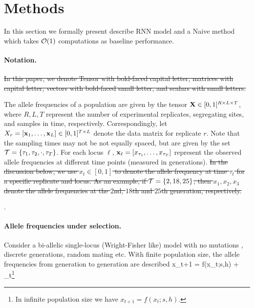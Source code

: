\section{Methods}
In this section we formally present describe RNN model and a Naive method which takes ${\cal O}(1)$ computations as baseline performance.

\paragraph{Notation.}
\sout{In this paper, we denote Tensor with bold-faced capital letter,
  matrices with capital letter, vectors with bold-faced small letter,
  and scalars with small letters.}

The allele frequencies of a population are given by the tensor ${\mathbf X}
\in [0,1]^{R \times L \times T}$, where $R,L,T$ represent the number
of experimental replicates, segregating sites, and samples in time,
respectively. Correspondingly, let $X_r=[{\mathbf x}_1 ,\ldots, {\mathbf x}_L]\in
[0,1]^ {T \times L}$ denote the data matrix for replicate $r$. Note
that the sampling times may not be not equally spaced, but are given
by the set ${\cal T}=\{\tau_1,\tau_2,\cdot, \tau_T \}$. For each locus
$\ell$, ${\mathbf x}_{\ell} =[x_{\tau_1},\ldots,x_{\tau_T}]$ represent the
observed allele frequencies at different time points (measured in
generations). \sout{In the discussion below, we use $x_t\in [0,1]$ to
  denote the allele frequency at time $\tau_t$ for a specific
  replicate and locus. As an example, if ${\cal T}=\{2,18,25\}$, then
  $x_1,x_2,x_3$ denote the allele frequencies at the $2$nd, $18$th and
  $25$th generation, respectively.}

.

\paragraph{Allele frequencies under selection.}
Consider a bi-allelic single-locus (Wright-Fisher like) model with no
mutations \cite{book-mathpopgen}, discrete generations, random mating
etc. With finite population size, the allele frequencies from
generation to generation are described 
\beq\label{eq:trans0}
x_{t+1} = f(x_t;s,h)  + \epsilon_t\footnote{In infinite population
  size we have $x_{t+1} = f(x_t;s,h)$.} 
\eeq

